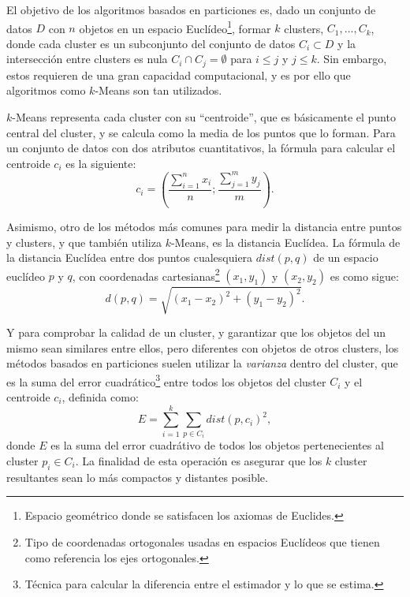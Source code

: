 \documentclass[3p,twocolumn]{elsarticle}
\begin{document}
El objetivo de los algoritmos basados en particiones es, dado un conjunto de datos $D$ con $n$ objetos en un espacio Euclídeo\footnote{Espacio geométrico donde se satisfacen los axiomas de Euclides.}, formar $k$ clusters, $C_{1}, ..., C_{k}$, donde cada cluster es un subconjunto del conjunto de datos $C_{i} \subset D$ y la intersección entre clusters es nula $C_{i} \cap C_{j} = \emptyset$ para $i \leq j$ y $j \leq k$. Sin embargo, estos requieren de una gran capacidad computacional, y es por ello que algoritmos como $k$-Means son tan utilizados.

$k$-Means representa cada cluster con su ``centroide'', que es básicamente el punto central del cluster, y se calcula como la media de los puntos que lo forman. Para un conjunto de datos con dos atributos cuantitativos, la fórmula para calcular el centroide $c_{i}$ es la siguiente: \begin{equation} c_{i} = \left( \frac{\sum _{i=1}^n x_{i}}{n}; \frac{\sum _{j=1}^m y_{j}}{m} \right). \end{equation} 

Asimismo, otro de los métodos más comunes para medir la distancia entre puntos y clusters, y que también utiliza $k$-Means, es la distancia Euclídea. La fórmula de la distancia Euclídea entre dos puntos cualesquiera $dist(p, q)$ de un espacio euclídeo $p$ y $q$, con coordenadas cartesianas\footnote{Tipo de coordenadas ortogonales usadas en espacios Euclídeos que tienen como referencia los ejes ortogonales.} $(x_{1}, y_{1})$ y $(x_{2}, y_{2})$ es como sigue: \begin{equation}  d\left( p,q\right) =  \sqrt{ \left(x_1-x_2 \right)^2 + \left(y_1 - y_2 \right)^2}. \end{equation} 

Y para comprobar la calidad de un cluster, y garantizar que los objetos del un mismo sean similares entre ellos, pero diferentes con objetos de otros clusters, los métodos basados en particiones suelen utilizar la \textit{varianza} dentro del cluster, que es la suma del error cuadrático\footnote{Técnica para calcular la diferencia entre el estimador y lo que se estima.} entre todos los objetos del cluster $C_i$ y el centroide $c_i$, definida como: \begin{equation} E =  \sum_{i=1}^{k}  \sum_{p \in C_i} dist(p, c_i)^2 , \end{equation} donde $E$ es la suma del error cuadrátivo de todos los objetos pertenecientes al cluster $p_i \in C_i$. La finalidad de esta operación es asegurar que los $k$ cluster resultantes sean lo más compactos y distantes posible.
\end{document}
